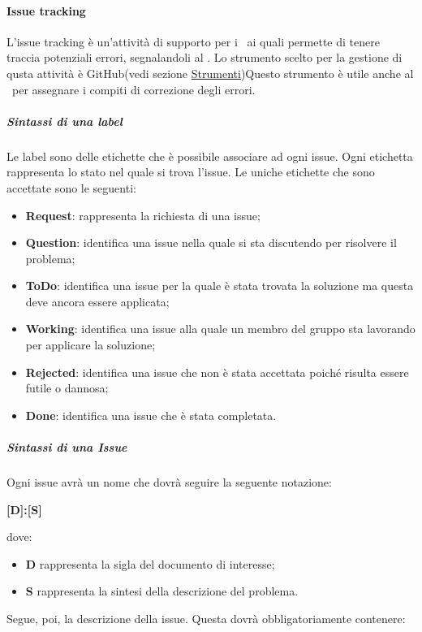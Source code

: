 \documentclass[../NormeProgetto.tex]{subfiles}
\begin{document}
		\paragraph{Issue tracking}
		L'issue tracking è un'attività di supporto per i \verificatori\ ai quali permette di tenere traccia potenziali errori, segnalandoli al \responsabilediprogetto. Lo strumento scelto per la gestione di qusta attività è GitHub(vedi sezione \hyperref[par:IssueTrk GitHub]{Strumenti})Questo strumento è utile anche al \responsabilediprogetto\ per assegnare i compiti di correzione degli errori. 
		\subparagraph{Sintassi di una label}
		Le label sono delle etichette che è possibile associare ad ogni issue. Ogni etichetta rappresenta lo stato nel quale si trova l'issue. Le uniche etichette che sono accettate sono le seguenti:
		\begin{itemize}
			\item \textbf{Request}: rappresenta la richiesta di una issue;
			\item \textbf{Question}: identifica una issue nella quale si sta discutendo per risolvere il problema;
			\item \textbf{ToDo}: identifica una issue per la quale è stata trovata la soluzione ma questa deve ancora essere applicata;
			\item \textbf{Working}: identifica una issue alla quale un membro del gruppo sta lavorando per applicare la soluzione;
			\item \textbf{Rejected}: identifica una issue che non è stata accettata poiché risulta essere futile o dannosa;
			\item \textbf{Done}: identifica una issue che è stata completata.
		\end{itemize}				
		\subparagraph{Sintassi di una Issue}
		Ogni issue avrà un nome che dovrà seguire la seguente notazione: \begin{center}\textbf{[D]:[S]}\end{center} dove:
		\begin{itemize} 
			\item \textbf{D} rappresenta la sigla del documento di interesse;
			\item \textbf{S} rappresenta la sintesi della descrizione del problema.
		\end{itemize}
		Segue, poi, la descrizione della issue. Questa dovrà obbligatoriamente contenere:
\end{document}
